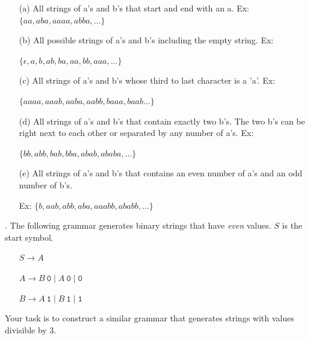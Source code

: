 \documentclass[11pt]{amsart}
\begin{document}
\begin{enumerate}

\item[(a)] All strings of a's and b's that start and end with an a. Ex: $\{aa, aba, aaaa, abba,...\}$

\item[(b)] All possible strings of a's and b's including the empty string. Ex: 

$\{\epsilon, a, b, ab, ba, aa, bb, aaa,...\}$

\item[(c)] All strings of a's and b's whose third to last character is a 'a'. Ex: 
\item[] 
$\{aaaa, aaab, aaba, aabb, baaa, baab...\}$

\item[(d)] All strings of a's and b's that contain exactly two b's. The two b's can be right next to each other or separated by any number of a's. Ex:

$\{bb, abb, bab, bba, abab, ababa, ...\}$

\item[(e)] All strings of a's and b's that contains an even number of a's and an odd number of b's. 
\item[] 
Ex: $\{b, aab, abb, aba, aaabb, ababb,...\}$

\end{enumerate}

\newpage

\vspace{0.5cm}

. The following grammar generates binary strings that have \emph{even} values. $S$ is the start symbol. 
 
\begin{enumerate}

\item[] $S\rightarrow A$ 

\item[] $A\rightarrow B\ \texttt{0} \mid A\ \texttt{0} \mid \texttt{0}$

\item[] $B\rightarrow A\ \texttt{1} \mid B\ \texttt{1} \mid \texttt{1}$

\end{enumerate}

\vspace{.05in}

Your task is to construct a similar grammar that generates strings with values divisible by 3. 
\end{document}
